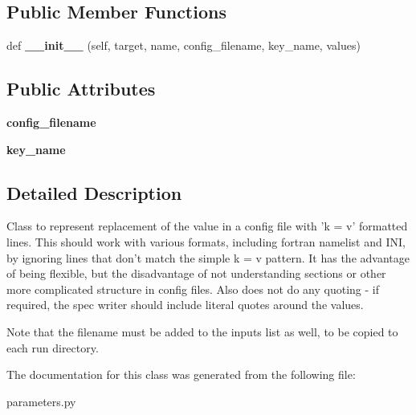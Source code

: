 \subsection*{Public Member Functions}
\begin{DoxyCompactItemize}
\item 
\mbox{\label{classcodar_1_1cheetah_1_1parameters_1_1_param_key_value_acbd81ea2c61adc66c1e5e9f150d9cc39}} 
def {\bfseries \+\_\+\+\_\+init\+\_\+\+\_\+} (self, target, name, config\+\_\+filename, key\+\_\+name, values)
\end{DoxyCompactItemize}
\subsection*{Public Attributes}
\begin{DoxyCompactItemize}
\item 
\mbox{\label{classcodar_1_1cheetah_1_1parameters_1_1_param_key_value_ac463b82e60e626e89e37d267803294ac}} 
{\bfseries config\+\_\+filename}
\item 
\mbox{\label{classcodar_1_1cheetah_1_1parameters_1_1_param_key_value_aed81003e4524c70ca0329433fa677f6c}} 
{\bfseries key\+\_\+name}
\end{DoxyCompactItemize}


\subsection{Detailed Description}
\begin{DoxyVerb}Class to represent replacement of the value in a config file with
'k = v' formatted lines. This should work with various formats, including
fortran namelist and INI, by ignoring lines that don't match the
simple k = v pattern. It has the advantage of being flexible, but the
disadvantage of not understanding sections or other more complicated
structure in config files. Also does not do any quoting - if required,
the spec writer should include literal quotes around the values.

Note that the filename must be added to the inputs list as well, to be
copied to each run directory.
\end{DoxyVerb}
 

The documentation for this class was generated from the following file\+:\begin{DoxyCompactItemize}
\item 
parameters.\+py\end{DoxyCompactItemize}
